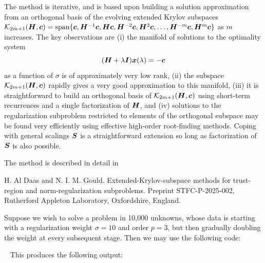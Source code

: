\documentclass{galahad}
\newcommand{\package}{nrek}
\begin{document}
\noindent
The method is iterative, and is based upon building a solution approximation
from an orthogonal basis of the evolving extended Krylov subspaces
${\cal K}_{2m+1}(\bmH,\bmc) = \mbox{span}\{\bmc,\bmH^{-1}\bmc,\bmH \bmc,
 \bmH^{-2}\bmc, \bmH^2\bmc,\ldots,\bmH^{-m}\bmc,\bmH^{m}\bmc\}$
as $m$ increases. The key observations are (i) the manifold of
solutions to the optimality system
\[ ( {\bm{H}} + \lambda {\bm{I}} ) {\bm{x}}(\lambda) = - {\bm{c}}\]
as a function of $\sigma$ is of approximately very low rank, (ii)
the subspace ${\cal K}_{2m+1}(\bmH,\bmc)$ rapidly gives a very good 
approximation to this manifold, (iii) it is straightforward to
build an orthogonal basis of ${\cal K}_{2m+1}(\bmH,\bmc)$
using short-term recurrences and a single factorization of ${\bm{H}}$, and
(iv) solutions to the regularization subproblem restricted to elements
of the orthogonal subspace may be found very efficiently 
using effective high-order root-finding methods.
Coping with general scalings ${\bm{S}}$ is a straightforward extension so long
as factorization of ${\bm{S}}$ is also possible.

\galreference
The method is described in detail in
\vspace*{1mm}

\noindent
H. Al Daas and N. I. M. Gould.
Extended-Krylov-subspace methods for trust-region and norm-regularization 
subproblems. Preprint STFC-P-2025-002, Rutherford Appleton Laboratory,
Oxfordshire, England.


\galexample
Suppose we wish to solve a problem in 10,000 unknowns, whose data is
starting with a regularization weight $\sigma = 10$ and order $p = 3$,
but then gradually doubling the weight
at every subsequent stage. Then we may use the following code:

{\tt \small
\VerbatimInput{\packageexample}
}
\noindent
This produces the following output:
{\tt \small
\VerbatimInput{\packageresults}
}
\end{document}
